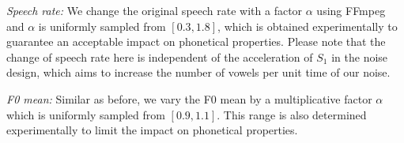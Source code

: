 \begin{table}[H]
    \vspace{-3mm}
    \caption{Phonetical properties for data augmentation}
    \centering
    \label{tab:phonetical_properties}
    \vspace{-3mm}
\end{table}

\textit{Speech rate:} We change the original speech rate with a factor $\alpha$ using FFmpeg~\cite{ffmpeg} and $\alpha$ is uniformly sampled from $[0.3,1.8]$, which is obtained experimentally to guarantee an acceptable impact on phonetical properties. Please note that the change of speech rate here is independent of the acceleration of $S_1$ in the noise design, which aims to increase the number of vowels per unit time of our noise.

\textit{F0 mean:} Similar as before, we vary the F0 mean by a multiplicative factor $\alpha$ which is uniformly sampled from $[0.9,1.1]$. This range is also determined experimentally to limit the impact on phonetical properties.

